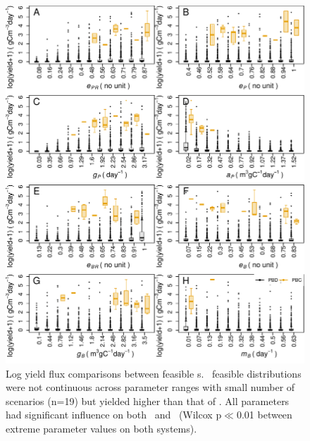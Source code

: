 \documentclass[env.tex]{subfiles}
\begin{document}
\begin{figure}[H]
    \centering
    \includegraphics[width=\linewidth]{result/harvB.pdf}
    \caption[Log yield flux comparisons between feasible \pbs s]{Log yield flux comparisons between feasible \pbs s.  \PBH\ feasible distributions were not continuous across parameter ranges with small number of scenarios (n=19) but yielded higher than that of \PBN.  All parameters had significant influence on both \PBN\ and \PBH\ (Wilcox p$\ll$0.01 between extreme parameter values on both systems).\lnExplain}
    \label{f:harvPB}
\end{figure}
\end{document}
